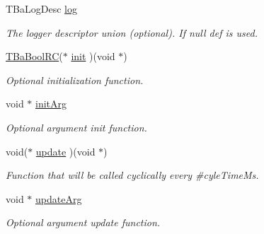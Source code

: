 \begin{DoxyCompactItemize}
T\+Ba\+Log\+Desc \hyperlink{structTOsProcCtrlTaskOpts_a6e6097af89a05b7fbf2deb6ea2a09efe}{log}
\begin{DoxyCompactList}\small\item\em The logger descriptor union (optional). If null def is used. \end{DoxyCompactList}\item 
\mbox{\label{structTOsProcCtrlTaskOpts_a81e319c1f890c3cc46eb92a89bcaf0d7}} 
\hyperlink{BaBool_8h_a84d5a0de4729ca4c89f2479c605dbf3d}{T\+Ba\+Bool\+RC}($\ast$ \hyperlink{structTOsProcCtrlTaskOpts_a81e319c1f890c3cc46eb92a89bcaf0d7}{init} )(void $\ast$)
\begin{DoxyCompactList}\small\item\em Optional initialization function. \end{DoxyCompactList}\item 
\mbox{\label{structTOsProcCtrlTaskOpts_ae99b61db863e33a0a730d0453226543d}} 
void $\ast$ \hyperlink{structTOsProcCtrlTaskOpts_ae99b61db863e33a0a730d0453226543d}{init\+Arg}
\begin{DoxyCompactList}\small\item\em Optional argument init function. \end{DoxyCompactList}\item 
\mbox{\label{structTOsProcCtrlTaskOpts_a0e0820ca8344f53abbdd74e19ae23ae2}} 
void($\ast$ \hyperlink{structTOsProcCtrlTaskOpts_a0e0820ca8344f53abbdd74e19ae23ae2}{update} )(void $\ast$)
\begin{DoxyCompactList}\small\item\em Function that will be called cyclically every \#cyle\+Time\+Ms. \end{DoxyCompactList}\item 
\mbox{\label{structTOsProcCtrlTaskOpts_acc3145ad90230f453520f263ed81c2f9}} 
void $\ast$ \hyperlink{structTOsProcCtrlTaskOpts_acc3145ad90230f453520f263ed81c2f9}{update\+Arg}
\begin{DoxyCompactList}\small\item\em Optional argument update function. \end{DoxyCompactList}\item 
\mbox{\label{structTOsProcCtrlTaskOpts_a5ab98d06a1e8e23dbce548e8303aa6ac}} 

\end{DoxyCompactItemize}
